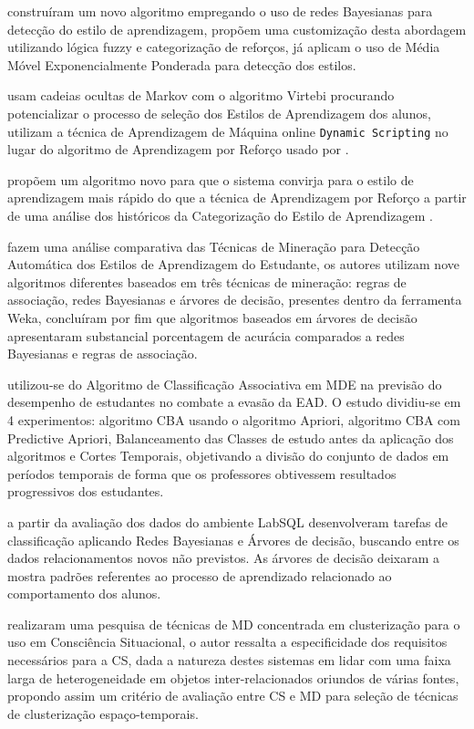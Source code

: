 \documentclass[12pt]{article}
\begin{document}
\cite{Salazar_Vivas_Luciana_2017} construíram um novo algoritmo empregando o uso de redes Bayesianas para detecção do estilo de aprendizagem, \cite{Falci_et_al_2018} propõem uma customização desta abordagem utilizando lógica fuzzy e categorização de reforços, já \cite{Ribeiro_et_al_2017} aplicam o uso de Média Móvel Exponencialmente Ponderada para detecção dos estilos.

\cite{Sena_etal_2016} usam cadeias ocultas de Markov com o algoritmo Virtebi procurando potencializar o processo de seleção dos Estilos de Aprendizagem dos alunos, \cite{Silva_etal_2017} utilizam a técnica de Aprendizagem de Máquina online \texttt{Dynamic Scripting} no lugar do algoritmo de Aprendizagem por Reforço usado por \cite{Dorca2012}.

\cite{Falci_et_al_2016} propõem um algoritmo novo para que o sistema convirja para o estilo de aprendizagem mais rápido do que a técnica de Aprendizagem por Reforço a partir de uma análise dos históricos da Categorização do Estilo de Aprendizagem .

\cite{Ahmad_Shamsuddin_2010} fazem uma análise comparativa das Técnicas de Mineração para Detecção Automática dos Estilos de Aprendizagem do Estudante, os autores utilizam nove algoritmos diferentes baseados em três técnicas de mineração: regras de associação, redes Bayesianas e árvores de decisão, presentes dentro da ferramenta Weka, concluíram por fim que algoritmos baseados em árvores de decisão apresentaram substancial porcentagem de acurácia comparados a redes Bayesianas e regras de associação.

\cite{Fernandes2017} utilizou-se do Algoritmo de  Classificação Associativa em MDE na previsão do desempenho de estudantes no combate a evasão da EAD. O estudo dividiu-se em 4 experimentos: algoritmo CBA usando o algoritmo Apriori, algoritmo CBA com Predictive Apriori, Balanceamento das Classes de estudo antes da aplicação dos algoritmos e Cortes Temporais, objetivando a divisão do conjunto de dados em períodos temporais de forma que os professores obtivessem resultados progressivos dos estudantes.

\cite{Dias_e_Filho_etal_2008} a partir da avaliação dos dados do ambiente LabSQL desenvolveram tarefas de classificação aplicando Redes Bayesianas e Árvores de decisão, buscando entre os dados relacionamentos novos não previstos. As árvores de decisão deixaram a mostra padrões referentes ao processo de aprendizado relacionado ao comportamento dos alunos. 

\cite{Mitsch_et_al_2013} realizaram uma pesquisa de técnicas de MD concentrada em clusterização para o uso em Consciência Situacional, o autor ressalta a especificidade dos requisitos necessários para a CS, dada a natureza destes sistemas em lidar com uma faixa larga de heterogeneidade em objetos inter-relacionados oriundos de várias fontes, propondo assim um critério de avaliação entre CS e MD para seleção de técnicas de clusterização espaço-temporais.
\end{document}
